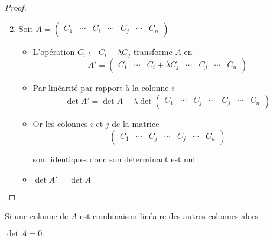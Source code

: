 \begin{frame}

\begin{proof} 

\begin{enumerate}
  \setcounter{enumi}{1}
  \item \pause Soit $A=\begin{pmatrix}
C_1&\cdots&C_i&\cdots&C_j&\cdots&C_n
\end{pmatrix}$

\begin{itemize}
  
  \item\pause L'opération $C_i \leftarrow C_i+\lambda C_j$ transforme $A$ en 
    \vspace{-.2cm}
$$A'=\begin{pmatrix}
C_1&\cdots&\displaystyle C_i+\lambda C_j&\cdots&C_j&\cdots&C_n\end{pmatrix}$$
 
  \vspace{-.2cm}
  
  \item \pause Par linéarité par rapport à la colonne $i$ 
    \vspace{-.2cm}
$$\det A'=\det A+\lambda \det \begin{pmatrix} C_1&\cdots&C_j&\cdots&C_j&\cdots&C_n
\end{pmatrix}$$

  \vspace{-.2cm}

  \item \pause Or les colonnes $i$ et $j$ de la matrice 
  \vspace{-.2cm}
  $$\begin{pmatrix} C_1&\cdots&C_j&\cdots&C_j&\cdots&C_n\end{pmatrix}$$ 
  
    \vspace{-.2cm}

  sont identiques \pause donc son déterminant est nul 
  
  \item \pause $\det A'=\det A$ \qedhere
\end{itemize}
\end{enumerate}
\qedhere\end{proof} 
\pause



\begin{corollaire} 
Si une colonne de $A$ est combinaison linéaire 
des autres colonnes alors \\
\centerline{$\det A=0$}
\end{corollaire}
\end{frame}


